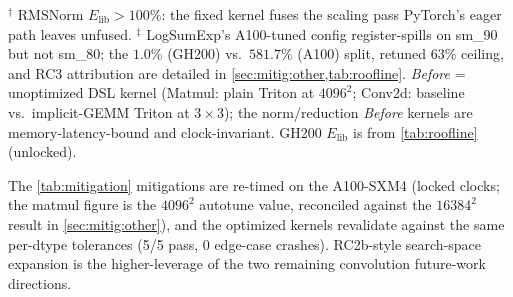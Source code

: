 \begin{table}[t]
{\begin{tabular}{lrrrrrl}
    \bottomrule
  \end{tabular}
  }
  \vspace{0.3em}
  {\small $^\dagger$ RMSNorm $E_\text{lib}>100\%$: the fixed kernel fuses the scaling pass PyTorch's eager path leaves unfused.
  $^\ddagger$ LogSumExp's A100-tuned config register-spills on sm\_90 but not sm\_80; the $1.0\%$ (GH200) vs.\ $581.7\%$ (A100) split, retuned $63\%$ ceiling, and RC3 attribution are detailed in \cref{sec:mitig:other,tab:roofline}.
  \emph{Before} = unoptimized DSL kernel (Matmul: plain Triton at $4096^2$; Conv2d: baseline vs.\ implicit-GEMM Triton at $3\times3$); the norm/reduction \emph{Before} kernels are memory-latency-bound and clock-invariant. GH200 $E_\text{lib}$ is from \cref{tab:roofline} (unlocked).}

\end{table}
The \cref{tab:mitigation} mitigations are re-timed on the A100-SXM4 (locked clocks; the matmul figure is the $4096^2$ autotune value, reconciled against the $16384^2$ result in \cref{sec:mitig:other}), and the optimized kernels revalidate against the same per-dtype tolerances (5/5 pass, 0 edge-case crashes). RC2b-style search-space expansion is the higher-leverage of the two remaining convolution future-work directions.
